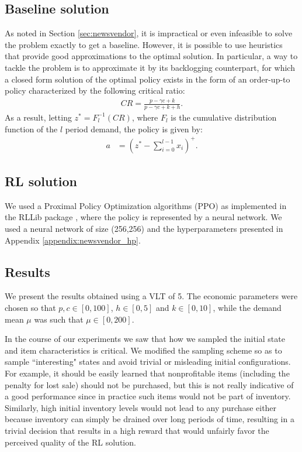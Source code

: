 \subsection{Baseline solution} 

As noted in Section \ref{sec:newsvendor}, it is impractical or even infeasible to solve the problem exactly to get a baseline. However, it is possible to use heuristics that provide good approximations to the optimal solution. In particular, a way to tackle the problem is to approximate it by its backlogging counterpart, for which a closed form solution of the optimal policy exists in the form of an order-up-to policy characterized by the following critical ratio:
\begin{align*}
CR = \frac{p-\gamma c + k}{p-\gamma c + k + h}.
\end{align*}
As a result, letting $z^* = F_l^{-1}(CR)$, where $F_l$ is the cumulative distribution  function of the $l$ period demand, the policy is given by:
\begin{align*}
a&= \left(z^* - \sum_{i=0}^{l-1} x_i\right)^+.
\end{align*}


\subsection{RL solution} 


We used a Proximal Policy Optimization algorithms (PPO) \cite{schulman2017proximal} as implemented in the RLLib package \cite{liang2017rllib}, where the policy is represented by a neural network. We used a neural network of size (256,256) and the hyperparameters presented in Appendix \ref{appendix:newsvendor_hp}.


\subsection{Results}

We present the results obtained using a VLT of 5. The economic parameters were chosen so that $p,c\in[0,100]$, $h\in[0,5]$ and $k\in[0,10]$, while the demand mean $\mu$ was such that $\mu\in[0,200]$.

In the course of our experiments we saw that how we sampled the initial state and item characteristics is critical. We modified the sampling scheme so as to sample ``interesting" states and avoid trivial or misleading initial configurations. For example, it should be easily learned that nonprofitable items (including the penalty for lost sale) should not be purchased, but this is not really indicative of a good performance since in practice such items would not be part of inventory. Similarly, high initial inventory levels would not lead to any purchase either because inventory can simply be drained over long periods of time, resulting in a trivial decision that results in a high reward that would unfairly favor the perceived quality of the RL solution. 

